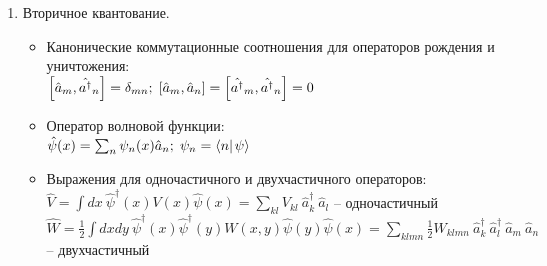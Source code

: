 \begin{enumerate}[label=\textbf{\underline{\arabic*.}}]
\begin{itemize}
        \end{itemize}
\item Вторичное квантование.  \begin{itemize}
            \item Канонические коммутационные соотношения для операторов рождения и уничтожения: \\
            $ \left[ \hat{a}_{m}, \hat{a^\dagger}_{n} \right] = \delta_{mn};\; \left[ \hat{a}_{m}, \hat{a}_{n} \right] = \left[ \hat{a^\dagger}_{m}, \hat{a^\dagger}_{n} \right] = 0 $
            \item Оператор волновой функции: \\
            $ \hat{\psi}(x) = \sum_n \psi_n(x)\hat{a}_n;\; \psi_n = \braket{n}{\psi} $
            \item Выражения для одночастичного и двухчастичного операторов: \\
            $ \hat{V} = \int dx\ \hat{\psi}^\dagger(x)V(x)\hat{\psi}(x) = \sum_{kl} V_{kl}\ \hat{a}^\dagger_k\ \hat{a}_l $ -- одночастичный \\
            $ \hat{W} = \frac12 \int dxdy\ \hat{\psi}^\dagger(x)\hat{\psi}^\dagger(y)W(x,y)\hat{\psi}(y)\hat{\psi}(x) = \sum_{klmn} \frac12 W_{klmn}\ \hat{a}^\dagger_k\ \hat{a}^\dagger_l\ \hat{a}_m\ \hat{a}_n $ -- двухчастичный


\end{itemize}
\end{enumerate}

